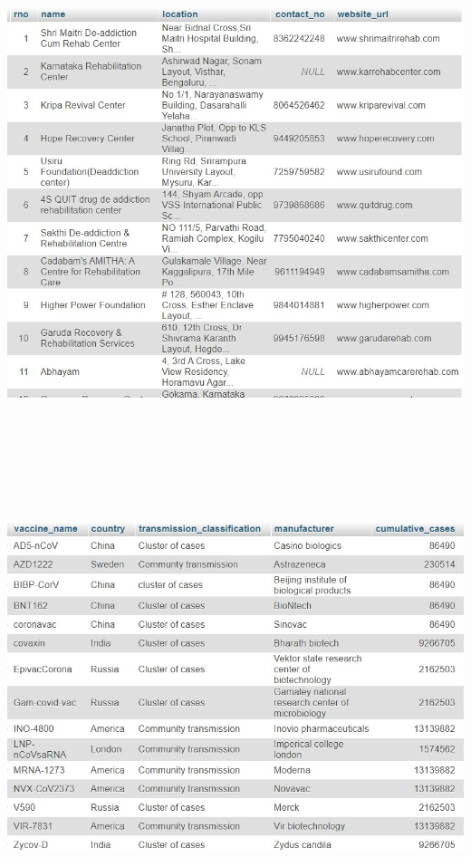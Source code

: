 \documentclass{report}
\begin{document}
\centerline{\includegraphics[width=7in,height=5in,keepaspectratio]{sd3}}\\
\centerline{\includegraphics[width=7in,height=5in,keepaspectratio]{sd4}}\\
\end{document}
